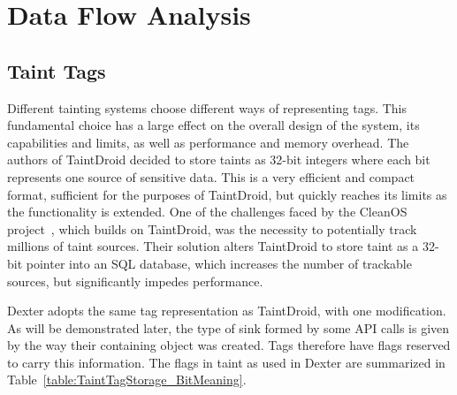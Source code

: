 \documentclass[12pt,twoside,notitlepage]{report}
\begin{document}
\section{Data Flow Analysis}
\label{section:DataFlowAnalysis}

\subsection{Taint Tags}

Different tainting systems choose different ways of representing tags. This fundamental choice has a large effect on the overall design of the system, its capabilities and limits, as well as performance and memory overhead. The authors of TaintDroid decided to store taints as 32-bit integers where each bit represents one source of sensitive data. This is a very efficient and compact format, sufficient for the purposes of TaintDroid, but quickly reaches its limits as the functionality is extended. One of the challenges faced by the CleanOS project~\cite{Tang:2012:CLM:2387880.2387888}, which builds on TaintDroid, was the necessity to potentially track millions of taint sources. Their solution alters TaintDroid to store taint as a 32-bit pointer into an SQL database, which increases the number of trackable sources, but significantly impedes performance. 

Dexter adopts the same tag representation as TaintDroid, with one modification. As will be demonstrated later, the type of sink formed by some API calls is given by the way their containing object was created. Tags therefore have flags reserved to carry this information. The flags in taint as used in Dexter are summarized in Table~\ref{table:TaintTagStorage_BitMeaning}.
\end{document}
